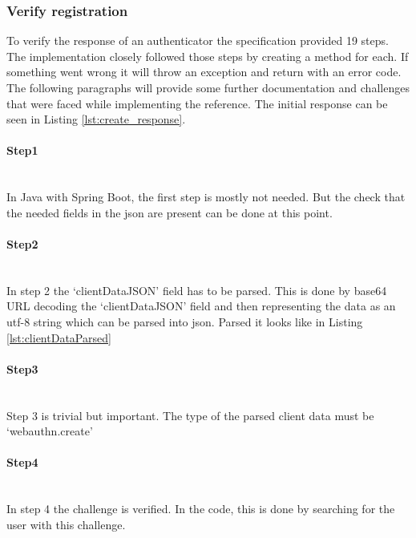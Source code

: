 \documentclass[a4paper, 11pt]{scrartcl}
\begin{document}
\subsubsection{Verify registration}

To verify the response of an authenticator the specification provided 19 steps. The implementation closely followed those steps by creating a method for each. If something went wrong it will throw an exception and return with an error code. The following paragraphs will provide some further documentation and challenges that were faced while implementing the reference. The initial response can be seen in Listing \ref{lst:create_response}.



\paragraph{Step1} \hfill \\ 
In Java with Spring Boot, the first step is mostly not needed. But the check that the needed fields in the \gls{json} are present can be done at this point.

\paragraph{Step2} \hfill \\ 
In step 2 the `clientDataJSON' field has to be parsed. This is done by \gls{base64} URL decoding the `clientDataJSON' field and then representing the data as an \gls{utf-8} string which can be parsed into \gls{json}. Parsed it looks like in Listing \ref{lst:clientDataParsed}



\paragraph{Step3}\hfill \\ 
Step 3 is trivial but important. The type of the parsed client data must be `webauthn.create'

\paragraph{Step4}\hfill \\ 
In step 4 the challenge is verified. In the code, this is done by searching for the user with this challenge.
\end{document}
